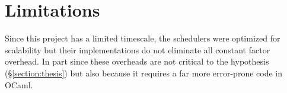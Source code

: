 \documentclass[12pt,a4paper,twoside]{report}
\begin{document}
\section{Limitations}

Since this project has a limited timescale, the schedulers were optimized for scalability but their implementations do not eliminate all constant factor overhead. In part since these overheads are not critical to the hypothesis (\S\ref{section:thesis}) but also because it requires a far more error-prone code in OCaml. 



\label{lastpage}
\end{document}
